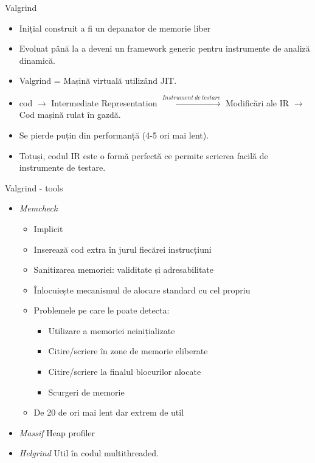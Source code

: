 \documentclass{beamer}
\begin{document}
\begin{frame}{Valgrind}
\begin{itemize}
\item Inițial construit a fi un depanator de memorie liber
\item \pause Evoluat până la a deveni un framework generic pentru instrumente de analiză dinamică.
\item \pause Valgrind = Mașină virtuală utilizând JIT.
\item \pause cod \pause$\rightarrow$ Intermediate Representation \pause$\xrightarrow{Instrument\ de\ testare}$ Modificări ale IR \pause$\rightarrow$ Cod mașină rulat în gazdă.
\item \pause Se pierde puțin din performanță \pause(4-5 ori mai lent).
\item \pause Totuși, codul IR este o formă perfectă ce permite scrierea facilă de instrumente de testare.
\end{itemize}
\end{frame}

\begin{frame}{Valgrind - tools}
\begin{itemize}
\item \textit{Memcheck}
\begin{itemize}
\item \pause Implicit
\item \pause Inserează cod extra în jurul fiecărei instrucțiuni
\item \pause Sanitizarea memoriei: \pause validitate \pause și adresabilitate
\item \pause Înlocuiește mecanismul de alocare standard cu cel propriu
\item \pause Problemele pe care le poate detecta:
\begin{itemize}
\item \pause Utilizare a memoriei neinițializate
\item \pause Citire/scriere în zone de memorie eliberate
\item \pause Citire/scriere la finalul blocurilor alocate
\item \pause Scurgeri de memorie
\end{itemize}
\item \pause De 20 de ori mai lent \pause dar extrem de util
\end{itemize}
\item \pause \textit{Massif} Heap profiler
\item \pause \textit{Helgrind} Util în codul multithreaded.
\end{itemize}
\end{frame}
\end{document}
